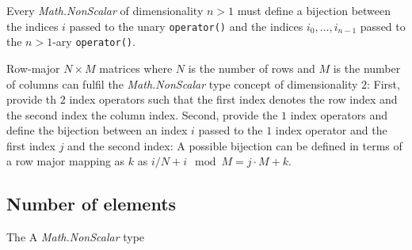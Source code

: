 \documentclass[oneside]{book}
\begin{document}
Every \textit{Math.NonScalar} of dimensionality $n > 1$     must define a
bijection between the indices $i$ passed to the unary \texttt{operator()}
and the indices $i_0,\ldots,i_{n-1}$ passed to the            $n > 1$-ary
\texttt{operator()}.\newline

\begin{tcolorbox}[title=Example]
Row-major $N \times M$ matrices where $N$ is the   number of
rows and $M$ is the number of columns can fulfil         the
\textit{Math.NonScalar} type concept of  dimensionality $2$:
First, provide th $2$ index operators such that the first
index denotes the row index and the second index      the
column index.
Second, provide the $1$ index   operators and define the
bijection between an index $i$ passed to the $1$   index
operator and the first index $j$   and the second index:
A possible bijection can be defined in terms of a    row
major mapping as $k$ as $i / N + i\mod M= j \cdot M +k$.
\end{tcolorbox}

\subsection{Number of elements}
The 
A \textit{Math.NonScalar} type 
\end{document}
